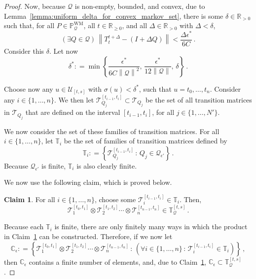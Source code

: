 \documentclass[10pt]{paper}
\theoremstyle{definition}
\newtheorem{claim}{Claim}[theorem]
\newcommand{\reals}{\mathbb{R}}
\newcommand{\realspos}{\reals_{>0}}
\newcommand{\realsnonneg}{\reals_{\geq 0}}
\newcommand{\processes}{\mathbb{P}}
\newcommand{\wmprocesses}{\processes^{\mathrm{WM}}}
\newcommand{\rateset}{\mathcal{Q}}
\newcommand{\norm}[1]{\left\lVert #1 \right\rVert}
\newcommand{\coloneqq}{:\!=}
\begin{document}
\begin{proof}
Now, because $\rateset$ is non-empty, bounded, and convex, due to Lemma~\ref{lemma:uniform_delta_for_convex_markov_set}, there is some $\delta\in\realspos$ such that, for all $P\in\wmprocesses_\rateset$, all $t\in\realsnonneg$, and all $\Delta\in\realspos$ with $\Delta<\delta$,
\begin{equation}\label{eq:lemma_total_bounded_uniform_delta}
(\exists Q\in\rateset)\,\norm{T_t^{t+\Delta} - (I+\Delta Q)} < \frac{\Delta\epsilon^*}{6C}\,.
\end{equation}
Consider this $\delta$. Let now
\begin{equation*}
\delta^* \coloneqq \min\left\{\frac{\epsilon^*}{6C\norm{\rateset}^2},\, \frac{\epsilon^*}{12\norm{\rateset}},\, \delta\right\}\,.
\end{equation*}

Choose now any $u\in\mathcal{U}_{[t,s]}$ with $\sigma(u)<\delta^*$, such that $u=t_0,\ldots,t_n$. Consider any $i\in\{1,\ldots,n\}$. We then let $\mathcal{T}_{Q_j}^{[t_{i-1},t_i]}\subset\mathcal{T}_{Q_j}$ be the set of all transition matrices in $\mathcal{T}_{Q_j}$ that are defined on the interval $[t_{i-1},t_i]$, for all $j\in\{1,\ldots,N'\}$.

We now consider the set of these families of transition matrices. For all $i\in\{1,\ldots,n\}$, let $\mathbb{T}_i$ be the set of families of transition matrices defined by
\begin{equation*}
\mathbb{T}_i \coloneqq \left\{ \mathcal{T}_{Q_j}^{[t_{i-1},t_i]} \,:\,Q_j\in\rateset_{\epsilon'} \right\}\,.
\end{equation*}
Because $\rateset_{\epsilon'}$ is finite, $\mathbb{T}_i$ is also clearly finite.

We now use the following claim, which is proved below.
\begin{claim}\label{claim:composition_restricted_trans_mat_sys_in_set}
For all $i\in\{1,\ldots,n\}$, choose some $\mathcal{T}_i^{[t_{i-1},t_i]}\in\mathbb{T}_i$. Then,
\begin{equation*}
\mathcal{T}_1^{[t_{0},t_1]} \otimes \mathcal{T}_2^{[t_{1},t_2]} \cdots \otimes \mathcal{T}_n^{[t_{n-1},t_n]} \in \mathbb{T}_\rateset^{[t,s]}\,.
\end{equation*}
\end{claim}
Because each $\mathbb{T}_i$ is finite, there are only finitely many ways in which the product in Claim~\ref{claim:composition_restricted_trans_mat_sys_in_set} can be constructed. Therefore, if we now let
\begin{equation*}
\mathbb{C}_\epsilon \coloneqq \left\{\mathcal{T}_1^{[t_{0},t_1]} \otimes \mathcal{T}_2^{[t_{1},t_2]} \cdots \otimes \mathcal{T}_n^{[t_{n-1},t_n]}\,:\,\left(\forall i\in\{1,\ldots,n\} \,:\,\mathcal{T}_i^{[t_{i-1},t_i]}\in\mathbb{T}_i\right) \right\}\,,
\end{equation*}
then $\mathbb{C}_\epsilon$ contains a finite number of elements, and, due to Claim~\ref{claim:composition_restricted_trans_mat_sys_in_set}, $\mathbb{C}_\epsilon\subset \mathbb{T}_\rateset^{[t,s]}$.


\end{proof}
\end{document}
